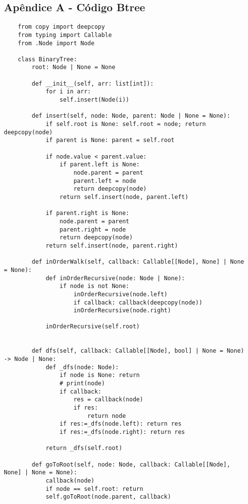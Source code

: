 \begin{appendices}
    \clearpage
    \onecolumn
    \chapter{Apêndice A - Código Btree}
    \begin{verbatim}
    from copy import deepcopy
    from typing import Callable
    from .Node import Node
    
    class BinaryTree:
        root: Node | None = None
    
        def __init__(self, arr: list[int]):
            for i in arr:
                self.insert(Node(i))
    
        def insert(self, node: Node, parent: Node | None = None):
            if self.root is None: self.root = node; return deepcopy(node)
            if parent is None: parent = self.root
    
            if node.value < parent.value:
                if parent.left is None:
                    node.parent = parent
                    parent.left = node
                    return deepcopy(node)
                return self.insert(node, parent.left)
            
            if parent.right is None:
                node.parent = parent
                parent.right = node
                return deepcopy(node)
            return self.insert(node, parent.right)
        
        def inOrderWalk(self, callback: Callable[[Node], None] | None = None):
            def inOrderRecursive(node: Node | None):
                if node is not None:
                    inOrderRecursive(node.left)
                    if callback: callback(deepcopy(node))
                    inOrderRecursive(node.right)
    
            inOrderRecursive(self.root)
    
    
        def dfs(self, callback: Callable[[Node], bool] | None = None) -> Node | None:
            def _dfs(node: Node):
                if node is None: return
                # print(node)
                if callback:
                    res = callback(node)
                    if res:
                        return node
                if res:=_dfs(node.left): return res
                if res:=_dfs(node.right): return res
    
            return _dfs(self.root)
        
        def goToRoot(self, node: Node, callback: Callable[[Node], None] | None = None):
            callback(node)
            if node == self.root: return
            self.goToRoot(node.parent, callback)
    \end{verbatim}
    
\end{appendices}